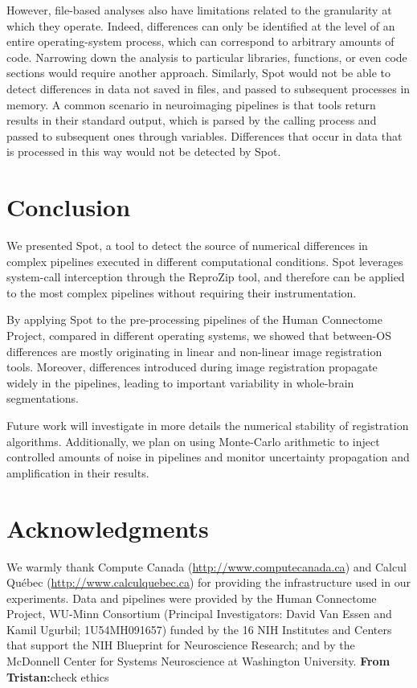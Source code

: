 \documentclass[a4paper,num-refs]{oup-contemporary}
\newcommand{\reprozip}[0]{ReproZip\xspace}
\newcommand{\tristan}[1]{\color{blue}\textbf{From Tristan:}#1\color{black}}
\newcommand{\toolname}[0]{Spot\xspace}
\begin{document}
However, file-based analyses also have limitations related to the
granularity at which they operate. Indeed, differences can only be
identified at the level of an entire operating-system process, which can
correspond to arbitrary amounts of code. Narrowing down the analysis to
particular libraries, functions, or even code sections would require
another approach. Similarly, \toolname would not be able to detect
differences in data not saved in files, and passed to subsequent processes
in memory. A common scenario in neuroimaging pipelines is that tools return
results in their standard output, which is parsed by the calling process
and passed to subsequent ones through variables. Differences that occur in data 
that is processed in this way would not be detected by \toolname.  

\section{Conclusion}

We presented \toolname, a tool to detect the source of numerical
differences in complex pipelines executed in different computational
conditions. \toolname leverages system-call interception through the
\reprozip tool, and therefore can be applied to the most complex pipelines
without requiring their instrumentation. 

By applying \toolname to the pre-processing pipelines of the Human
Connectome Project, compared in different operating systems, we showed that
between-OS differences are mostly originating in linear and non-linear
image registration tools. Moreover, differences introduced during image
registration propagate widely in the pipelines, leading to important
variability in whole-brain segmentations.

Future work will investigate in more details the numerical stability of
registration algorithms. Additionally, we plan on using Monte-Carlo arithmetic
to inject controlled amounts of noise in pipelines and monitor
uncertainty propagation and amplification in their results.

\section{Acknowledgments}

We warmly thank Compute Canada (\url{http://www.computecanada.ca}) and Calcul
Qu\'ebec (\url{http://www.calculquebec.ca}) for providing the infrastructure used in our experiments.
Data and pipelines were provided by the Human Connectome Project, WU-Minn 
Consortium (Principal Investigators: David Van Essen and Kamil Ugurbil; 
1U54MH091657) funded by the 16 NIH Institutes and Centers that support 
the NIH Blueprint for Neuroscience Research; and by the McDonnell 
Center for Systems Neuroscience at Washington University.
\tristan{check ethics}



\end{document}
